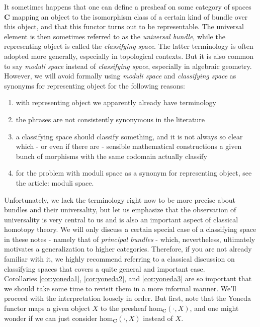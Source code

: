 It sometimes happens that one can define a presheaf on some category of {\glqq}spaces{\grqq} $\mathbf{C}$ mapping an object to the isomorphism class of a certain kind of bundle over this object, and that this functor turns out to be representable.
The universal element is then sometimes referred to as the \textit{universal bundle}, while the representing object is called the \textit{classifying space}.
The latter terminology is often adopted more generally, especially in topological contexts.
But it is also common to say \textit{moduli space} instead of \textit{classifying space}, especially in algebraic geometry.
However, we will avoid formally using \textit{moduli space} and \textit{classifying space} as synonyms for {\glqq}representing object{\grqq} for the following reasons:
\begin{enumerate}
\item[$\bullet$]
with {\glqq}representing object{\grqq} we apparently already have terminology
\item[$\bullet$]
the phrases are not consistently synonymous in the literature
\item[$\bullet$]
a classifying space should classify something, and it is not always so clear which - or even if there are - sensible mathematical constructions a given bunch of morphisms with the same codomain actually classify
\item[$\bullet$]
for the problem with moduli space as a synonym for representing object, see the \cite{wiki-nlab0000} article: moduli space.
\end{enumerate}
Unfortunately, we lack the terminology right now to be more precise about bundles and their universality, but let us emphasize that the observation of universality is very central to us and is also an important aspect of classical homotopy theory.
We will only discuss a certain special case of a classifying space in these notes - namely that of \textit{principal bundles} - which, nevertheless, ultimately motivates a generalization to higher categories.
Therefore, if you are not already familiar with it, we highly recommend referring to a classical discussion on classifying spaces \cite{4dc38f27} that covers a quite general and important case.
\\
Corollaries \ref{cor:yoneda1}, \ref{cor:yoneda2}, and \ref{cor:yoneda3} are so important that we should take some time to revisit them in a more informal manner.
We'll proceed with the interpretation loosely in order.
But first, note that the Yoneda functor maps a given object $X$ to the presheaf $\mathrm{hom}_{\mathbf{C}}(\cdot,X)$, and one might wonder if we can just consider $\mathrm{hom}_{\mathbf{C}}(\cdot,X)$ instead of $X$.
